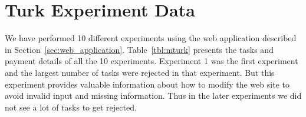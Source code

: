 \documentclass[11pt]{article}
\begin{document}
\section{Turk Experiment Data} \label{sec:turk_data}

We have performed 10 different experiments using the web application described in Section~\ref{sec:web_application}. Table~\ref{tbl:mturk} presents the tasks and payment details of all the 10 experiments. Experiment 1 was the first experiment and the largest number of tasks were rejected in that experiment. But this experiment provides valuable information about how to modify the web site to avoid invalid input and missing information. Thus in the later experiments we did not see a lot of tasks to get rejected.

\begin{table}[hbtp]
\caption{Amazon mechanical turk experiments and their properties. Duration in hours per 100 tasks show the popularity of some tasks compared to others.}
\centering
{}
\label{tbl:mturk}
\end{table}
\end{document}
